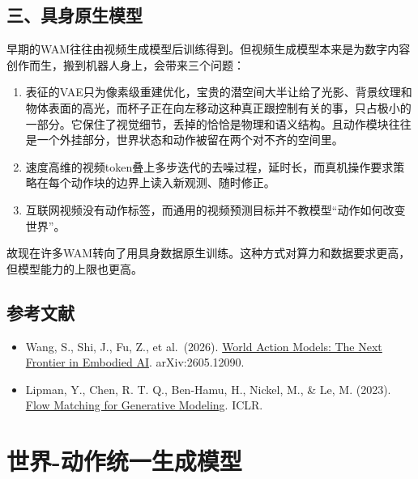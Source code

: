 \hypertarget{ux4e09ux5177ux8eabux539fux751fux6a21ux578b}{%
\subsection{三、具身原生模型}\label{ux4e09ux5177ux8eabux539fux751fux6a21ux578b}}

早期的WAM往往由视频生成模型后训练得到。但视频生成模型本来是为数字内容创作而生，搬到机器人身上，会带来三个问题：

\begin{enumerate}
\def\labelenumi{\arabic{enumi}.}
\item
  表征的VAE只为像素级重建优化，宝贵的潜空间大半让给了光影、背景纹理和物体表面的高光，而杯子正在向左移动这种真正跟控制有关的事，只占极小的一部分。它保住了视觉细节，丢掉的恰恰是物理和语义结构。且动作模块往往是一个外挂部分，世界状态和动作被留在两个对不齐的空间里。
\item
  速度高维的视频token叠上多步迭代的去噪过程，延时长，而真机操作要求策略在每个动作块的边界上读入新观测、随时修正。
\item
  互联网视频没有动作标签，而通用的视频预测目标并不教模型``动作如何改变世界''。
\end{enumerate}

故现在许多WAM转向了用具身数据原生训练。这种方式对算力和数据要求更高，但模型能力的上限也更高。

\hypertarget{ux53c2ux8003ux6587ux732e-158}{%
\subsection{参考文献}\label{ux53c2ux8003ux6587ux732e-158}}

\vspace{0.25em}
\begin{itemize}
\tightlist
\item
  Wang, S., Shi, J., Fu, Z., et al.~(2026). \href{https://arxiv.org/abs/2605.12090}{World Action Models: The Next Frontier in Embodied AI}. arXiv:2605.12090.
\item
  Lipman, Y., Chen, R. T. Q., Ben-Hamu, H., Nickel, M., \& Le, M. (2023). \href{https://arxiv.org/abs/2210.02747}{Flow Matching for Generative Modeling}. ICLR.
\end{itemize}

\clearpage

\hypertarget{ux4e16ux754c-ux52a8ux4f5cux7edfux4e00ux751fux6210ux6a21ux578b}{%
\section{世界-动作统一生成模型}\label{ux4e16ux754c-ux52a8ux4f5cux7edfux4e00ux751fux6210ux6a21ux578b}}

